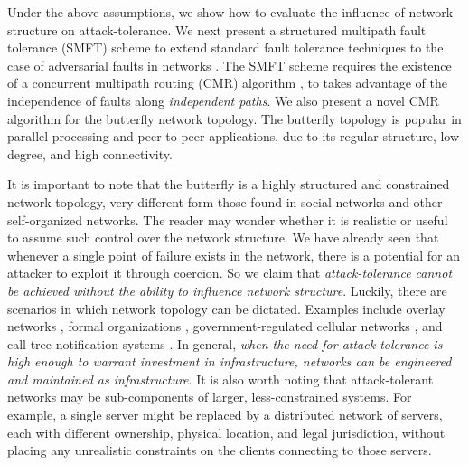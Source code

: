 \documentclass[10pt,letterpaper]{article}
\begin{document}
Under the above assumptions,
we show how to evaluate the influence of network structure
on attack-tolerance.
We next present a structured multipath fault tolerance (SMFT) scheme to extend
standard fault tolerance techniques to the case of adversarial faults in
networks
\cite{avizienis_basic_2004, von_neumann_probabilistic_1956}.
The SMFT scheme requires the existence of a
concurrent multipath routing (CMR) algorithm
\cite{zin_survey_2015, qadir_exploiting_2015, khiani_comparative_2013},
to takes advantage of the independence of faults
along {\em independent paths}.
We also present a novel CMR algorithm for the butterfly network topology.
The butterfly topology is popular in parallel processing
\cite{kshemkalyani_distributed_2008} and
peer-to-peer \cite{lua_survey_2005, korzun_structured_2013}
applications, due to its regular structure, low degree, and high connectivity.

It is important to note that the butterfly is a highly structured and constrained
network topology,
very different form those found in social networks and other
self-organized networks.
The reader may wonder whether it is realistic or useful to assume such control over
the network structure.
We have already seen that whenever a single point of failure exists in the network,
there is a potential for an attacker to exploit it through coercion.
So we claim that {\em attack-tolerance cannot be achieved without the ability to influence
network structure}.
Luckily, there are scenarios in which network topology can be dictated.
Examples include overlay networks
\cite{lua_survey_2005, korzun_structured_2013},
formal organizations \cite{mohr_explaining_1982},
government-regulated cellular networks \cite{walker_mass_2012},
and call tree notification systems \cite{nickerson_thinking_2010}.
In general,
{\em when the need for attack-tolerance is high enough to warrant investment
in infrastructure, networks can be engineered and maintained as infrastructure}.
It is also worth noting that attack-tolerant networks may be sub-components of
larger, less-constrained systems.
For example, a single server might be replaced by a distributed network of servers,
each with different ownership, physical location, and legal jurisdiction,
without placing any unrealistic constraints on the clients connecting to
those servers.
\end{document}
